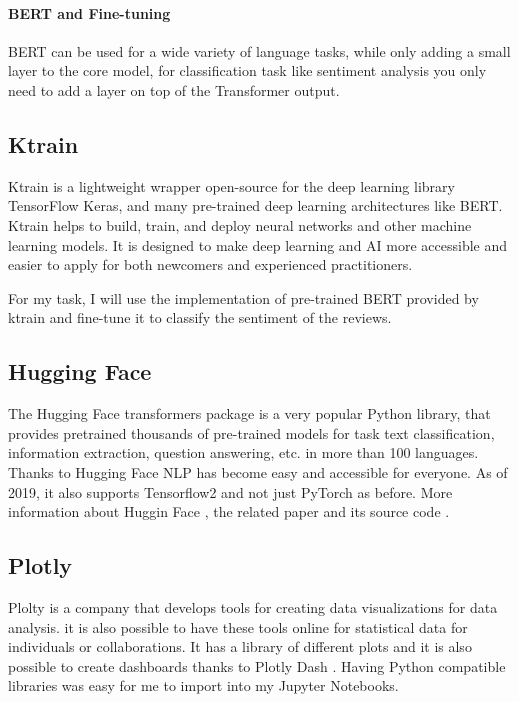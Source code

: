 \paragraph{BERT and Fine-tuning} BERT can be used for a wide variety of language tasks, while only adding a small layer to the core model, for classification task like sentiment analysis you only need to add a layer on top of the Transformer output.

\subsection{Ktrain}
Ktrain \cite{maiya_amaiyaktrain_2021} is a lightweight wrapper open-source for the deep learning library TensorFlow Keras, and many pre-trained deep learning architectures like BERT.
Ktrain helps to build, train, and deploy neural networks and other machine learning models. 
It is designed to make deep learning and AI more accessible and easier to apply for both newcomers and experienced practitioners.

For my task, I will use the implementation of pre-trained BERT provided by ktrain and fine-tune it to classify the sentiment of the reviews.


\subsection{Hugging Face}
The Hugging Face transformers package is a very popular Python library, that provides pretrained thousands of pre-trained models for task text classification, information extraction, question answering, etc. in more than 100 languages.
Thanks to Hugging Face NLP has become easy and accessible for everyone.
As of 2019, it also supports Tensorflow2 and not just PyTorch \cite{noauthor_pytorch_nodate} as before.
More information about Huggin Face \cite{noauthor_hugging_nodate}, the related paper \cite{wolf-etal-2020-transformers} and its source code \cite{noauthor_huggingfacetransformers_2021}.

\subsection{Plotly}
Plolty \cite{noauthor_plotly_nodate} is a company that develops tools for creating data visualizations for data analysis.
it is also possible to have these tools online for statistical data for individuals or collaborations.
It has a library of different plots \cite{noauthor_plotly_nodate-1} and it is also possible to create dashboards thanks to Plotly Dash \cite{noauthor_dash_nodate}.
Having Python compatible libraries was easy for me to import into my Jupyter Notebooks.